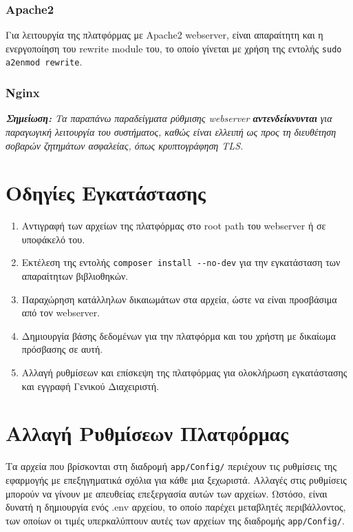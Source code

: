 \subsubsection{Apache2}


Για λειτουργία της πλατφόρμας με Apache2 webserver, είναι απαραίτητη και η ενεργοποίηση του rewrite module του, το οποίο γίνεται με χρήση της εντολής \verb!sudo a2enmod rewrite!.

\subsubsection{Nginx}


\textit{\textbf{Σημείωση:} Τα παραπάνω παραδείγματα ρύθμισης webserver \textbf{αντενδείκνυνται} για παραγωγική λειτουργία του συστήματος, καθώς είναι ελλειπή ως προς τη διευθέτηση σοβαρών ζητημάτων ασφαλείας, όπως κρυπτογράφηση TLS.}

\section{Οδηγίες Εγκατάστασης}
\begin{enumerate}
	\item Αντιγραφή των αρχείων της πλατφόρμας στο root path του webserver ή σε υποφάκελό του.
	\item Εκτέλεση της εντολής \verb!composer install --no-dev! για την εγκατάσταση των απαραίτητων βιβλιοθηκών.
	\item Παραχώρηση κατάλληλων δικαιωμάτων στα αρχεία, ώστε να είναι προσβάσιμα από τον webserver.
	\item Δημιουργία βάσης δεδομένων για την πλατφόρμα και του χρήστη με δικαίωμα πρόσβασης σε αυτή.
	\item Αλλαγή ρυθμίσεων και επίσκεψη της πλατφόρμας για ολοκλήρωση εγκατάστασης και εγγραφή Γενικού Διαχειριστή.
\end{enumerate}

\section{Αλλαγή Ρυθμίσεων Πλατφόρμας}
Τα αρχεία που βρίσκονται στη διαδρομή \verb!app/Config/! περιέχουν τις ρυθμίσεις της εφαρμογής με επεξηγηματικά σχόλια για κάθε μια ξεχωριστά. Αλλαγές στις ρυθμίσεις μπορούν να γίνουν με απευθείας επεξεργασία αυτών των αρχείων. Ωστόσο, είναι δυνατή η δημιουργία ενός .env αρχείου, το οποίο παρέχει μεταβλητές περιβάλλοντος, των οποίων οι τιμές υπερκαλύπτουν αυτές των αρχείων της διαδρομής \verb!app/Config/!.

